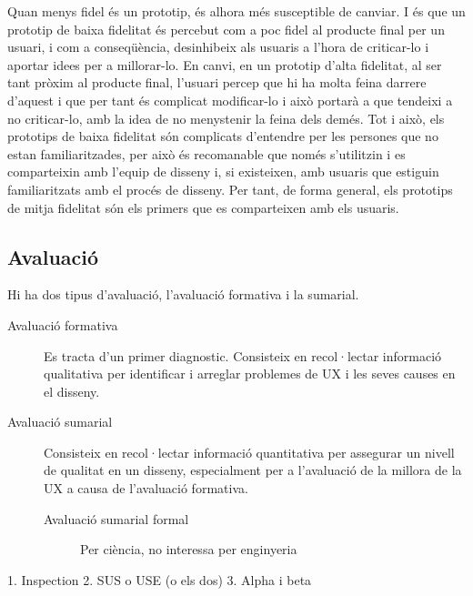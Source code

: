 Quan menys fidel és un prototip, és alhora més susceptible de canviar. I és que un prototip de baixa fidelitat és percebut com a poc fidel al producte final per un usuari, i com a conseqüència, desinhibeix als usuaris a l'hora de criticar-lo i aportar idees per a millorar-lo. En canvi, en un prototip d'alta fidelitat, al ser tant pròxim al producte final, l'usuari percep que hi ha molta feina darrere d'aquest i que per tant és complicat modificar-lo i això portarà a que tendeixi a no criticar-lo, amb la idea de no menystenir la feina dels demés. Tot i això, els prototips de baixa fidelitat són complicats d'entendre per les persones que no estan familiaritzades, per això és recomanable que només s'utilitzin i es comparteixin amb l'equip de disseny i, si existeixen, amb usuaris que estiguin familiaritzats amb el procés de disseny. Per tant, de forma general, els prototips de mitja fidelitat són els primers que es comparteixen amb els usuaris. 

\subsection{Avaluació}
Hi ha dos tipus d'avaluació, l'avaluació formativa i la sumarial. 

\begin{description}
\item[Avaluació formativa] Es tracta d'un primer diagnostic. Consisteix en recol·lectar informació qualitativa per identificar i arreglar problemes de \ac{UX} i les seves causes en el disseny.
\item[Avaluació sumarial] Consisteix en recol·lectar informació quantitativa per assegurar un nivell de qualitat en un disseny, especialment per a l'avaluació de la millora de la \ac{UX} a causa de l'avaluació formativa.

\begin{description}
\item[Avaluació sumarial formal] Per ciència, no interessa per enginyeria
\end{description}
\end{description}

1. Inspection
2. SUS o USE (o els dos)
3. Alpha i beta



